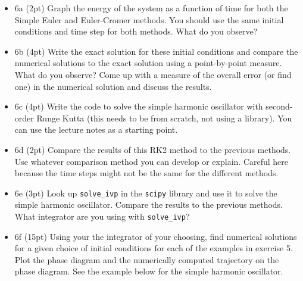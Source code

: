 \documentclass[11pt]{article}
\providecommand{\tightlist}{%
      \setlength{\itemsep}{0pt}\setlength{\parskip}{0pt}}
\begin{document}
    \begin{itemize}
\tightlist
\item
  6a (2pt) Graph the energy of the system as a function of time for both
  the Simple Euler and Euler-Cromer methods. You should use the same
  initial conditions and time step for both methods. What do you
  observe?
\end{itemize}

    \begin{itemize}
\tightlist
\item
  6b (4pt) Write the exact solution for these initial conditions and
  compare the numerical solutions to the exact solution using a
  point-by-point measure. What do you observe? Come up with a measure of
  the overall error (or find one) in the numerical solution and discuss
  the results.
\end{itemize}

    \begin{itemize}
\tightlist
\item
  6c (4pt) Write the code to solve the simple harmonic oscillator with
  second-order Runge Kutta (this needs to be from scratch, not using a
  library). You can use the lecture notes as a starting point.
\end{itemize}

    \begin{itemize}
\tightlist
\item
  6d (2pt) Compare the results of this RK2 method to the previous
  methods. Use whatever comparison method you can develop or explain.
  Careful here because the time steps might not be the same for the
  different methods.
\end{itemize}

    \begin{itemize}
\tightlist
\item
  6e (3pt) Look up \texttt{solve\_ivp} in the \texttt{scipy} library and
  use it to solve the simple harmonic oscillator. Compare the results to
  the previous methods. What integrator are you using with
  \texttt{solve\_ivp}?
\end{itemize}

    \begin{itemize}
\tightlist
\item
  6f (15pt) Using your the integrator of your choosing, find numerical
  solutions for a given choice of initial conditions for each of the
  examples in exercise 5. Plot the phase diagram and the numerically
  computed trajectory on the phase diagram. See the example below for
  the simple harmonic oscillator.
\end{itemize}
\end{document}
